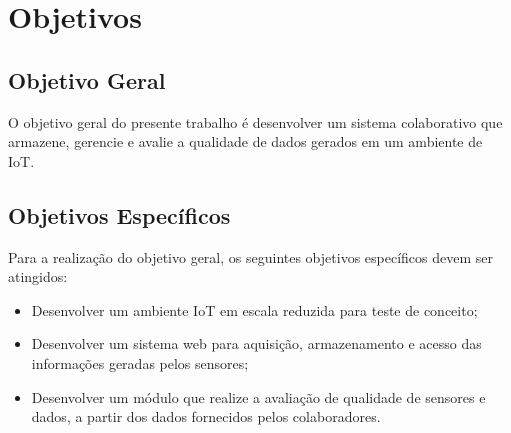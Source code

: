 \section{Objetivos}
\subsection{Objetivo Geral}
\qquad O objetivo geral do presente trabalho é desenvolver um sistema colaborativo que armazene, gerencie e avalie a qualidade de dados
gerados em um ambiente de \acrlong{IoT}.
\subsection{Objetivos Específicos}
Para a realização do objetivo geral, os seguintes objetivos específicos devem ser atingidos:
\begin{itemize}
  \item Desenvolver um ambiente \acrshort{IoT} em escala reduzida para teste de conceito;
  \item Desenvolver um sistema web para aquisição, armazenamento e acesso das informações geradas pelos sensores;
  \item Desenvolver um módulo que realize a avaliação de qualidade de sensores e dados, a partir dos dados fornecidos pelos colaboradores.
\end{itemize}

